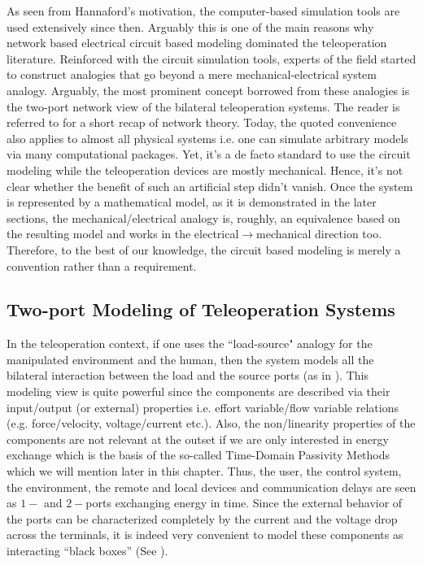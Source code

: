 As seen from Hannaford's motivation, the computer-based simulation tools are used extensively since then. Arguably
this is one of the main reasons why network based electrical circuit based modeling dominated the teleoperation literature. 
Reinforced with the circuit simulation tools, experts of the field started to construct analogies that go beyond
a mere mechanical-electrical system analogy. Arguably, the most prominent concept borrowed from these analogies is the two-port network 
view of the bilateral teleoperation systems. The reader is referred to  for a short recap of network theory.
Today, the quoted convenience also applies to almost all physical systems i.e. one can simulate arbitrary models via many 
computational packages. Yet, it's a de facto standard to use the circuit modeling while the teleoperation devices are mostly 
mechanical. Hence, it's not clear whether the benefit of such an artificial step didn't vanish. Once the system is represented 
by a mathematical model, as it is demonstrated in the later sections, the mechanical/electrical analogy is, roughly, an equivalence
based on the resulting model and works in the electrical$\to$mechanical direction too. Therefore, to the best of our knowledge, the 
circuit based modeling is merely a convention rather than a requirement.

\subsection{Two-port Modeling of Teleoperation Systems}

In the teleoperation context, if one uses the ``load-source" analogy for the manipulated environment 
and the human, then the system models all the bilateral interaction between the load and the source 
ports (as in ). This modeling view is quite powerful since the components are described via their input/output 
(or external) properties i.e. effort variable/flow variable relations (e.g. force/velocity, voltage/current etc.). Also, the non/linearity
properties of the components are not relevant at the outset if we are only interested in energy exchange which is the basis
of the so-called Time-Domain Passivity Methods \cite{hannafordryu} which we will mention later in this chapter. Thus, 
the user, the control system, the environment, the remote and local devices and communication delays are seen as 
$1-$ and $2-$ports exchanging energy in time. Since the external behavior of the ports can be characterized completely by the 
current and the voltage drop across the terminals, it is indeed very convenient to model these components as 
interacting ``black boxes'' (See ).


